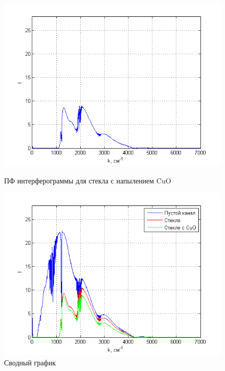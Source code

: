\documentclass[a4paper,12pt]{article} %
\begin{document}
\begin{figure}[h!]
\begin{center}
            \hfill
            \begin{minipage}[h!]{0.48\linewidth}
                \includegraphics[width=1\linewidth]{7.png}
                \caption{ПФ интерферограммы для стекла с напылением CuO}
                \label{picture_7}
            \end{minipage}
            \hfill
            \begin{minipage}[h!]{0.48\linewidth}
                \includegraphics[width=1\linewidth]{8.png}
                \caption{Сводный график}
                \label{picture_8}
            \end{minipage}
        \end{center}
    \end{figure}
\end{document}
